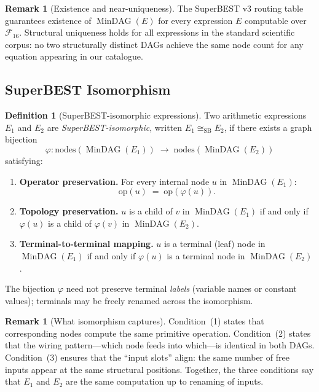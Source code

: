 \documentclass[12pt,a4paper]{article}
\theoremstyle{definition}
\newtheorem{definition}[theorem]{Definition}
\newtheorem{remark}[theorem]{Remark}
\newcommand{\MinDAG}{\operatorname{MinDAG}}
\newcommand{\siso}{\cong_{\mathrm{SB}}}
\begin{document}
\begin{remark}[Existence and near-uniqueness]
The SuperBEST v3 routing table guarantees existence of $\MinDAG(E)$ for every
expression $E$ computable over $\mathcal{F}_{16}$.  Structural uniqueness holds
for all expressions in the standard scientific corpus: no two structurally
distinct DAGs achieve the same node count for any equation appearing in our
catalogue.
\end{remark}

\subsection{SuperBEST Isomorphism}

\begin{definition}[SuperBEST-isomorphic expressions]
\label{def:iso}
Two arithmetic expressions $E_1$ and $E_2$ are \emph{SuperBEST-isomorphic},
written $E_1 \siso E_2$, if there exists a graph bijection
\[
  \varphi \colon \mathrm{nodes}(\MinDAG(E_1))
             \;\longrightarrow\;
             \mathrm{nodes}(\MinDAG(E_2))
\]
satisfying:
\begin{enumerate}
  \item \textbf{Operator preservation.}
        For every internal node $u$ in $\MinDAG(E_1)$:
        \[
          \mathrm{op}(u) \;=\; \mathrm{op}(\varphi(u)).
        \]
  \item \textbf{Topology preservation.}
        $u$ is a child of $v$ in $\MinDAG(E_1)$ if and only if $\varphi(u)$
        is a child of $\varphi(v)$ in $\MinDAG(E_2)$.
  \item \textbf{Terminal-to-terminal mapping.}
        $u$ is a terminal (leaf) node in $\MinDAG(E_1)$ if and only if
        $\varphi(u)$ is a terminal node in $\MinDAG(E_2)$.
\end{enumerate}
The bijection $\varphi$ need not preserve terminal \emph{labels}
(variable names or constant values); terminals may be freely renamed across
the isomorphism.
\end{definition}

\begin{remark}[What isomorphism captures]
Condition~(1) states that corresponding nodes compute the same primitive
operation.  Condition~(2) states that the wiring pattern---which node feeds
into which---is identical in both DAGs.  Condition~(3) ensures that the
``input slots'' align: the same number of free inputs appear at the same
structural positions.  Together, the three conditions say that $E_1$ and
$E_2$ are the same computation up to renaming of inputs.
\end{remark}
\end{document}
